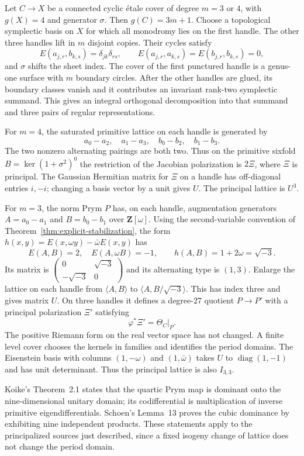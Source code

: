 \documentclass[11pt]{article}
\theoremstyle{definition}
\theoremstyle{remark}
\newcommand{\Z}{\mathbf Z}
\begin{document}
Let $C\to X$ be a connected cyclic \'etale cover of degree $m=3$ or $4$, with $g(X)=4$ and generator $\sigma$. Then $g(C)=3m+1$. Choose a topological symplectic basis on $X$ for which all monodromy lies on the first handle. The other three handles lift in $m$ disjoint copies. Their cycles satisfy
\[
 E(a_{j,r},b_{k,s})=\delta_{jk}\delta_{rs},
 \qquad E(a_{j,r},a_{k,s})=E(b_{j,r},b_{k,s})=0,
\]
and $\sigma$ shifts the sheet index. The cover of the first punctured handle is a genus-one surface with $m$ boundary circles. After the other handles are glued, its boundary classes vanish and it contributes an invariant rank-two symplectic summand. This gives an integral orthogonal decomposition into that summand and three pairs of regular representations.

For $m=4$, the saturated primitive lattice on each handle is generated by
\[
 a_0-a_2,\quad a_1-a_3,\quad b_0-b_2,\quad b_1-b_3.
\]
The two nonzero alternating pairings are both two. Thus on the primitive sixfold $B=\ker(1+\sigma^2)^0$ the restriction of the Jacobian polarization is $2\Xi$, where $\Xi$ is principal. The Gaussian Hermitian matrix for $\Xi$ on a handle has off-diagonal entries $i,-i$; changing a basis vector by a unit gives $U$. The principal lattice is $U^3$.

For $m=3$, the norm Prym $P$ has, on each handle, augmentation generators $A=a_0-a_1$ and $B=b_0-b_1$ over $\Z[\omega]$. Using the second-variable convention of
Theorem~\ref{thm:explicit-stabilization}, the form
$h(x,y)=E(x,\omega y)-\bar\omega E(x,y)$ has
\[
 E(A,B)=2,\quad E(A,\omega B)=-1,
 \qquad h(A,B)=1+2\omega=\sqrt{-3}.
\]
Its matrix is $\left(\begin{smallmatrix}0&\sqrt{-3}\\-\sqrt{-3}&0\end{smallmatrix}\right)$ and its alternating type is $(1,3)$. Enlarge the lattice on each handle from $\langle A,B\rangle$ to $\langle A,B/\sqrt{-3}\rangle$. This has index three and gives matrix $U$. On three handles it defines a degree-$27$ quotient $P\to P'$ with a principal polarization $\Xi'$ satisfying
\[
 \varphi^*\Xi'=\Theta_C|_P.
\]
The positive Riemann form on the real vector space has not changed. A finite level cover chooses the kernels in families and identifies the period domains. The Eisenstein basis with columns $(1,-\omega)$ and $(1,\bar\omega)$ takes $U$ to $\operatorname{diag}(1,-1)$ and has unit determinant. Thus the principal lattice is also $I_{3,3}$.

Koike's Theorem~2.1 states that the quartic Prym map is dominant onto the nine-dimensional unitary domain; its codifferential is multiplication of inverse primitive eigendifferentials. Schoen's Lemma~13 proves the cubic dominance by exhibiting nine independent products. These statements apply to the principalized sources just described, since a fixed isogeny change of lattice does not change the period domain.
\end{document}
